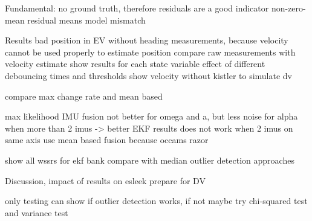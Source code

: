 Fundamental: no ground truth, therefore residuals are a good indicator
non-zero-mean residual means model mismatch~\cite[p.~158]{AlexanderWischnewski.2019}

Results
bad position in EV without heading measurements, because velocity cannot be used properly to estimate position
compare raw measurements with velocity estimate
show results for each state variable
effect of different debouncing times and thresholds
show velocity without kistler to simulate dv

compare max change rate and mean based

max likelihood IMU fusion not better for omega and a, but less noise for alpha when more than 2 imus -> better EKF results
does not work when 2 imus on same axis
use mean based fusion because occams razor

show all wssrs for ekf bank
compare with median outlier detection approaches


Discussion, impact of results on esleek
prepare for DV

only testing can show if outlier detection works, if not maybe try chi-squared test and variance test

